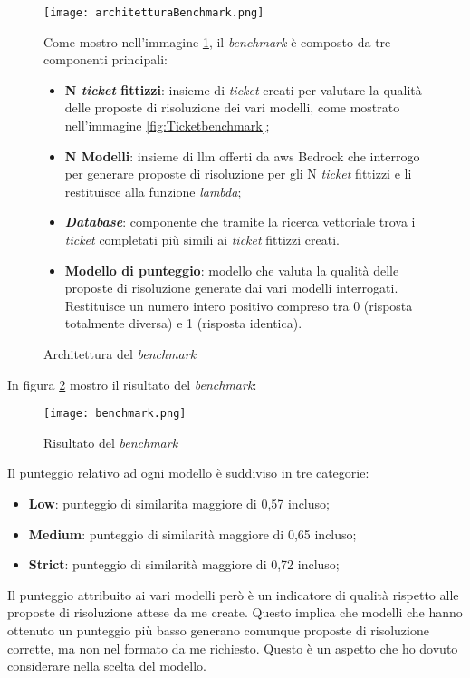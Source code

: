 \begin{figure}[H]
    \centering
    \texttt{[image: architetturaBenchmark.png]}
    \caption{Architettura del \textit{benchmark}}
    \label{fig:benchmarkArchitecture}
\noindent
Come mostro nell'immagine \ref{fig:benchmarkArchitecture}, il \textit{benchmark} è composto da tre componenti principali:
\begin{itemize}
    \item \textbf{N \textit{ticket} fittizzi}: insieme di \textit{ticket} creati per valutare la qualità delle proposte di risoluzione dei vari modelli, come mostrato nell'immagine \ref{fig:Ticketbenchmark};
    \item \textbf{N Modelli}: insieme di \gls{llm} offerti da \gls{aws} Bedrock che interrogo per generare proposte di risoluzione per gli N \textit{ticket} fittizzi e li restituisce alla funzione \textit{lambda}; 
    \item \textbf{\textit{Database}}: componente che tramite la ricerca vettoriale trova i \textit{ticket} completati più simili ai \textit{ticket} fittizzi creati. 
    \item \textbf{Modello di punteggio}: modello che valuta la qualità delle proposte di risoluzione generate dai vari modelli interrogati. Restituisce un numero intero positivo compreso tra 0 (risposta totalmente diversa) e 1 (risposta identica).
\end{itemize}
\end{figure}
In figura \ref{fig:benchmarkResult} mostro il risultato del \textit{benchmark}:
\begin{figure}[H]
    \centering
    \texttt{[image: benchmark.png]}
    \caption{Risultato del \textit{benchmark}}
    \label{fig:benchmarkResult}
\end{figure}
\noindent
Il punteggio relativo ad ogni modello è suddiviso in tre categorie:
\begin{itemize}
    \item \textbf{Low}: punteggio di similarita maggiore di 0,57 incluso;
    \item \textbf{Medium}: punteggio di similarità maggiore di 0,65 incluso;
    \item \textbf{Strict}: punteggio di similarità maggiore di 0,72 incluso;
\end{itemize}
Il punteggio attribuito ai vari modelli però è un indicatore di qualità rispetto alle proposte di risoluzione attese da me create. Questo implica che modelli che hanno ottenuto un punteggio più basso generano comunque proposte di risoluzione corrette, ma non nel formato da me richiesto. Questo è un aspetto che ho dovuto considerare nella scelta del modello.
